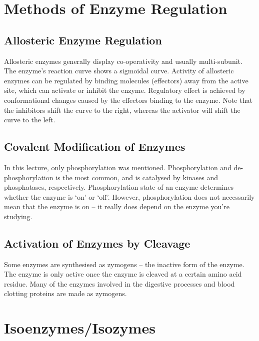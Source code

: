 \section{Methods of Enzyme Regulation}

\subsection{Allosteric Enzyme Regulation}

\begin{center}
\end{center}

Allosteric enzymes generally display co-operativity and usually multi-subunit.
The enzyme's reaction curve shows a sigmoidal curve.
Activity of allosteric enzymes can be regulated by binding molecules (effectors) away from the active site, which can activate or inhibit the enzyme.
Regulatory effect is achieved by conformational changes caused by the effectors binding to the enzyme.
Note that the inhibitors shift the curve to the right, whereas the activator will shift the curve to the left.

\subsection{Covalent Modification of Enzymes}

In this lecture, only phosphorylation was mentioned.
Phosphorylation and de-phosphorylation is the most common, and is catalysed by kinases and phosphatases, respectively.
Phosphorylation state of an enzyme determines whether the enzyme is `on' or `off'.
However, phosphorylation does not necessarily mean that the enzyme is on -- it really does depend on the enzyme you're studying.

\subsection{Activation of Enzymes by Cleavage}

Some enzymes are synthesised as zymogens -- the inactive form of the enzyme.
The enzyme is only active once the enzyme is cleaved at a certain amino acid residue.
Many of the enzymes involved in the digestive processes and blood clotting proteins are made as zymogens.

\section{Isoenzymes/Isozymes}

